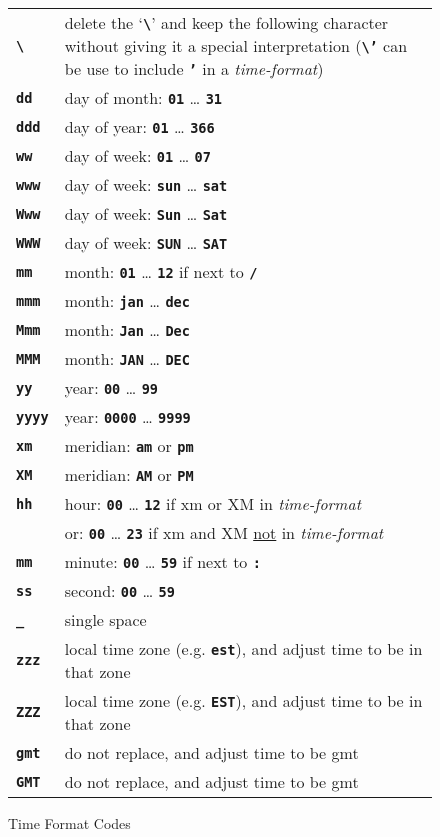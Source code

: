 \documentclass[12pt]{article}
\newcommand{\TT}[1]{{\tt \bfseries #1}}
\newcommand{\ttkey}[1]{{\tt \bfseries #1}}
\newcommand{\BSLASH}{\textbackslash}
\newlength{\figurewidth}
\newenvironment{boxedfigure}[1][!btp]%
	{\begin{figure*}[#1]
	 \begin{lrbox}{\figurebox}
	 \begin{minipage}{\figurewidth}

	 \vspace*{1ex}}%
	{
	 \vspace*{1ex}

	 \end{minipage}
	 \end{lrbox}
	 \begin{center}
	 \fbox{\hspace*{0.1in}\usebox{\figurebox}\hspace*{0.1in}}
	 \end{center}
	 \end{figure*}}
\begin{document}
\begin{boxedfigure}
\begin{center}
\begin{tabular}{lp{4.5in}}
\ttkey{\BSLASH} & delete the `\TT{\BSLASH}'
                                and keep the following character without
				giving it a special interpretation
				(\TT{\BSLASH'} can be use to include
				 \TT{'} in a {\em time-format})\\
\ttkey{dd} & day of month: \TT{01} \ldots{} \TT{31} \\
\ttkey{ddd} & day of year: \TT{01} \ldots{} \TT{366} \\
\ttkey{ww} & day of week: \TT{01} \ldots{} \TT{07} \\
\ttkey{www} & day of week: \TT{sun} \ldots{} \TT{sat} \\
\ttkey{Www} & day of week: \TT{Sun} \ldots{} \TT{Sat} \\
\ttkey{WWW} & day of week: \TT{SUN} \ldots{} \TT{SAT} \\
\ttkey{mm} & month: \TT{01} \ldots{} \TT{12}
                               if next to \TT{/} \\
\ttkey{mmm} & month: \TT{jan} \ldots{} \TT{dec} \\
\ttkey{Mmm} & month: \TT{Jan} \ldots{} \TT{Dec} \\
\ttkey{MMM} & month: \TT{JAN} \ldots{} \TT{DEC} \\
\ttkey{yy} & year: \TT{00} \ldots{} \TT{99} \\
\ttkey{yyyy} & year: \TT{0000} \ldots{} \TT{9999} \\
\ttkey{xm} & meridian: \TT{am} or \TT{pm} \\
\ttkey{XM} & meridian: \TT{AM} or \TT{PM} \\
\ttkey{hh} & hour: \TT{00} \ldots{} \TT{12}
			       if xm or XM in {\em time-format} \\
			     & or: \TT{00} \ldots{} \TT{23}
			       if xm and XM \underline{not}
			       in {\em time-format} \\
\ttkey{mm} & minute: \TT{00} \ldots{} \TT{59}
                               if next to \TT{:} \\
\ttkey{ss} & second: \TT{00} \ldots{} \TT{59} \\
\ttkey{\_} & single space \\
\ttkey{zzz} & local time zone (e.g. \TT{est}),
                                and adjust time to be in that zone \\
\ttkey{ZZZ} & local time zone (e.g. \TT{EST}),
				and adjust time to be in that zone \\
\ttkey{gmt} & do not replace,
				and adjust time to be gmt \\
\ttkey{GMT} & do not replace,
				and adjust time to be gmt \\
\end{tabular}
\end{center}
\caption{Time Format Codes}
\label{TIME-FORMAT-CODES}
\end{boxedfigure}
\end{document}
